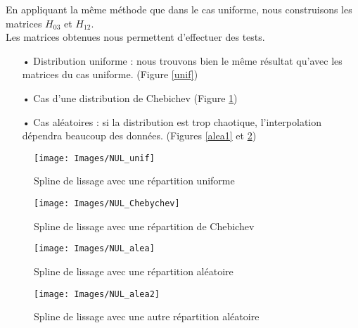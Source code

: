 \documentclass[a4paper,12pt]{article} %
\begin{document}
                En appliquant la même méthode que dans le cas uniforme, nous construisons les matrices $H_{03}$ et $H_{12}$.\\
                
                Les matrices obtenues nous permettent d'effectuer des tests.
    
                \begin{itemize}
                \item[•] Distribution uniforme : nous trouvons bien le même résultat qu'avec les matrices du cas uniforme. (Figure \ref{unif})
                \item[•] Cas d'une distribution de Chebichev (Figure \ref{chebi})
                \item[•] Cas aléatoires : si la distribution est trop chaotique, l'interpolation dépendra beaucoup des données. (Figures \ref{alea1} et \ref{alea2})
                \end{itemize}
                
                \begin{figure}[H]
                \begin{center}
                   \texttt{[image: Images/NUL\_unif]} 
                    \caption{Spline de lissage avec une répartition uniforme}
                    \label{unif}
                \endminipage{}
                   \texttt{[image: Images/NUL\_Chebychev]} 
                \caption{Spline de lissage avec une répartition de Chebichev}
                \label{chebi}
                \endminipage{}
                \end{center}
                \end{figure}
                \begin{figure}[H]
                \begin{center}
                   \texttt{[image: Images/NUL\_alea]} 
                \caption{Spline de lissage avec une répartition aléatoire}
                \label{alea1}
                \endminipage{}
                   \texttt{[image: Images/NUL\_alea2]} 
                \caption{Spline de lissage avec une autre répartition aléatoire}
                \label{alea2}
                \endminipage{}
                
                \end{center}
                \end{figure}
            
\end{document}
